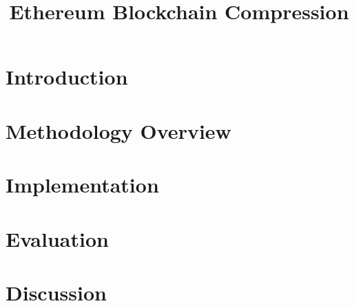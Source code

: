 \documentclass[10pt,numbers]{sigplanconf}
\theoremstyle{definition}
\begin{document}
\allowdisplaybreaks[1]





\title{Ethereum Blockchain Compression}
\maketitle
\begin{abstract}

\end{abstract}



\section{Introduction} \label{sec:intro}





\section{Methodology Overview}\label{sec:overview}


\section{Implementation}\label{sec:implement}


\section{Evaluation}\label{sec:evaluation}


\section{Discussion}\label{sec:discuss}

\end{document}
